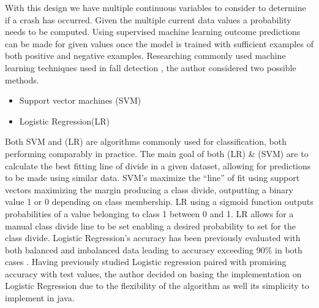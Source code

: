With this design we have multiple continuous variables to consider to determine if a crash has occurred.  Given the multiple current data values a probability needs to be computed. Using supervised machine learning outcome predictions can be made for given values once the model is trained with sufficient examples of both positive and negative examples. Researching commonly used machine learning techniques used in fall detection \cite{commonSolutions}, the author considered two possible methods. 
\begin{itemize}
\item Support vector machines (SVM)
\item Logistic Regression(LR)
\end{itemize}
Both SVM and (LR) are algorithms commonly used for classification, both performing comparably in practice. The main goal of both (LR) \& (SVM) are to calculate the best fitting line of divide in a given dataset, allowing for predictions to be made using similar data. SVM’s maximize the “line” of fit using support vectors maximizing the margin producing a class divide, outputting  a binary value 1 or 0 depending on class membership. LR using a sigmoid function outputs probabilities of a value belonging to class 1 between 0 and 1. LR allows for a manual class divide line to be set enabling a desired probability to set for the class divide. Logistic Regression's accuracy has been previously evaluated with both balanced and imbalanced data leading to accuracy exceeding 90\% in both cases \cite{suit}. Having previously studied Logistic regression paired with promising accuracy with test values, the author decided on basing the implementation on Logistic Regression due to the flexibility of the algorithm as well its simplicity to implement in java.


























